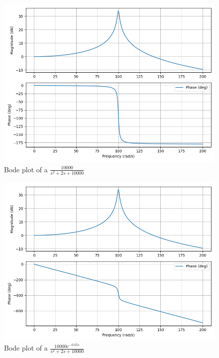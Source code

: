 \documentclass[journal,12pt,onecolumn]{IEEEtran}
\theoremstyle{remark}
\begin{document}
\begin{figure}[h]
    \centering
    \includegraphics[width=\linewidth]{2023/IN/43/figs/A.png}
    \caption{Bode plot of a $\frac{10000}{s^2+2s+10000}$}
\end{figure}
\begin{figure}[h]
    \centering
    \includegraphics[width=\linewidth]{2023/IN/43/figs/B.png}
    \caption{Bode plot of a $\frac{10000e^{-0.05s}}{s^2+2s+10000}$}
\end{figure}
\end{document}
